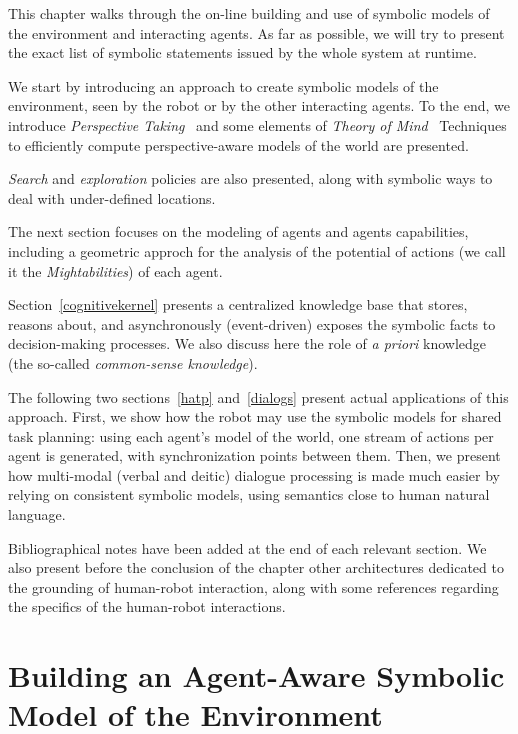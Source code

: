\documentclass{svmult}
\begin{document}
This chapter walks through the on-line building and use of symbolic models of
the environment and interacting agents. As far as possible, we will try to
present the exact list of symbolic statements issued by the whole system at
runtime.

We start by introducing an approach to create symbolic models of the
environment, seen by the robot or by the other interacting agents. To the end,
we introduce \emph{Perspective Taking}~\cite{Flavell1992,Tversky1999} and some
elements of \emph{Theory of Mind}~\cite{Scassellati2002} Techniques to efficiently compute perspective-aware
models of the world are presented. 

\emph{Search} and \emph{exploration} policies are also presented, along with
symbolic ways to deal with under-defined locations.

The next section focuses on the modeling of agents and agents capabilities,
including a geometric approch for the analysis of the potential of actions (we
call it the \emph{Mightabilities}) of each agent.

Section~\ref{cognitivekernel} presents a centralized knowledge base that
stores, reasons about, and asynchronously (event-driven) exposes the symbolic
facts to decision-making processes. We also discuss here the role of {\it a
priori} knowledge (the so-called \emph{common-sense knowledge}).

The following two sections~\ref{hatp} and~\ref{dialogs} present actual
applications of this approach. First, we show how the robot may
use the symbolic models for shared task planning: using each agent's model of
the world, one stream of actions per agent is generated, with synchronization
points between them. Then, we present how multi-modal (verbal and deitic)
dialogue processing is made much easier by relying on consistent symbolic
models, using semantics close to human natural language.

Bibliographical notes have been added at the end of each relevant section.  We
also present before the conclusion of the chapter other architectures dedicated
to the grounding of human-robot interaction, along with some references
regarding the specifics of the human-robot interactions.



\section{Building an Agent-Aware Symbolic Model of the Environment}
\label{sec:situ}
\end{document}
